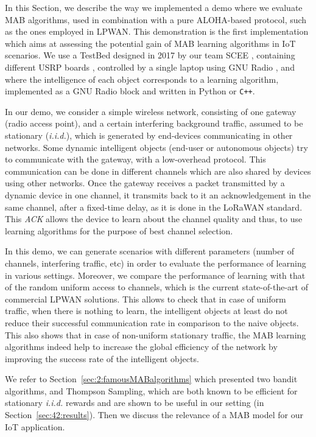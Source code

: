In this Section, we describe the way we implemented a demo where we evaluate MAB algorithms, used in combination with a pure ALOHA-based protocol, such as the ones employed in LPWAN.
This demonstration is the first implementation which aims at assessing the potential gain of MAB learning algorithms in IoT scenarios.
%
We use a TestBed designed in 2017 by our team SCEE \cite[Appendix~3]{Bodinier17}, containing different USRP boards \cite{USRPDocumentation}, controlled by a single laptop using GNU Radio \cite{GNURadioDocumentation},
and where the intelligence of each object corresponds to a learning algorithm, implemented as a GNU Radio block \cite{GNURadioCompanionDocumentation} and written in Python or \texttt{C++}.

In our demo, we consider a simple wireless network, consisting of one gateway (radio access point), and a certain interfering background traffic, assumed to be stationary (\emph{i.i.d.}), which is generated by end-devices communicating in other networks.
Some dynamic intelligent objects (end-user or autonomous objects) try to communicate with the gateway, with a low-overhead protocol. This communication can be done in different channels which are also shared by devices using other networks.
Once the gateway receives a packet transmitted by a dynamic device in one channel, it transmits back to it an acknowledgement in the same channel, after a fixed-time delay, as it is done in the LoRaWAN standard.
This \emph{ACK} allows the device to learn about the channel quality and thus, to use learning algorithms for the purpose of best channel selection.

In this demo, we can generate scenarios with different parameters (number of channels, interfering traffic, etc) in order to evaluate the performance of learning in various settings.
Moreover, we compare the performance of learning with that of the random uniform access to channels, which is the current state-of-the-art of commercial LPWAN solutions.
%
This allows to check that in case of uniform traffic, when there is nothing to learn, the intelligent objects at least do not reduce their successful communication rate in comparison to the naive objects.
This also shows that in case of non-uniform stationary traffic, the MAB learning algorithms indeed help to increase the global efficiency of the network by improving the success rate of the intelligent objects.

We refer to Section~\ref{sec:2:famousMABalgorithms} which presented two bandit algorithms, \UCB{} and Thompson Sampling,
which are both known to be efficient for stationary \emph{i.i.d.} rewards and are shown to be useful in our setting (in Section~\ref{sec:42:results}).
Then we discuss the relevance of a MAB model for our IoT application.

